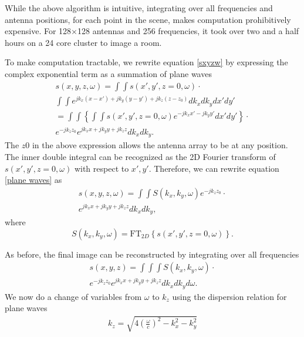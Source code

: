 \documentclass[twocolumn]{article}
\begin{document}
While the above algorithm is intuitive, integrating over all frequencies and antenna positions, for each point in the scene, makes computation prohibitively expensive. For 128$\times$128 antennas and 256 frequencies, it took over two and a half hours on a 24 core cluster to image a room. 

To make computation tractable, we rewrite equation \ref{sxyzw} by expressing the complex exponential term as a summation of plane waves
\begin{gather}
	s(x,y,z,\omega) = \int \int s(x', y', z=0, \omega) \cdot \nonumber \\
	 \int \int e^{j k_x (x-x') + j k_y (y-y') + j k_z (z-z_0)} dk_x dk_y dx' dy' \nonumber \\
%	 
	 = \int \int \left\{ \int \int s(x', y', z=0, \omega) e^{-j k_x x' - j k_y y'} dx' dy' \right\} \cdot \nonumber \\
	 e^{-j k_z z_0} e^{j k_x x + j k_y y + j k_z z} dk_x dk_y.
	 \label{plane waves}
\end{gather}
The $z0$ in the above expression allows the antenna array to be at any position. The inner double integral can be recognized as the 2D Fourier transform of $s(x', y', z=0, \omega)$ with respect to $x', y'$. Therefore, we can rewrite equation \ref{plane waves} as
\begin{gather}
	s(x,y,z,\omega) = \int \int  S(k_x, k_y, \omega) e^{-j k_z z_0} \cdot \nonumber \\
	e^{j k_x x + j k_y y + j k_z z} dk_x dk_y,
\end{gather}
where
\begin{equation}
	 S(k_x, k_y, \omega) = \text{FT}_{2D}\left\{ s(x', y', z=0, \omega) \right\}.
\end{equation}

As before, the final image can be reconstructed by integrating over all frequencies
\begin{gather}
	s(x,y,z) = \int \int \int   S(k_x, k_y, \omega) \cdot \nonumber \\
	e^{-j k_z z_0} e^{j k_x x + j k_y y + j k_z z} dk_x dk_y d\omega.
	\label{sxyz}
\end{gather}
We now do a change of variables from $\omega$ to $k_z$ using the dispersion relation for plane waves
\begin{gather}
	k_z = \sqrt{ 4 (\frac{\omega}{c})^2 - k_x^2 - k_y^2 }
\end{gather}
\end{document}
